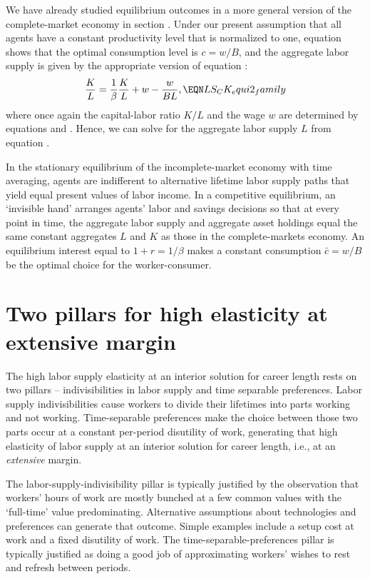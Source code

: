 We have already studied equilibrium outcomes in a more
general version of the complete-market economy in section
. Under our present assumption
that all agents have a constant productivity level
that is normalized to one, equation 
shows that the optimal consumption level is $c=w/B$, and
the aggregate labor supply is given by the appropriate
version of equation :
$$
{K \over L} = {1 \over \beta } {K \over L} + w
     - { w \over B L},
                                                    \EQN LS_CK_equi2_family
$$
where once again the capital-labor ratio $K/L$ and the wage
$w$ are determined by equations  and
. Hence, we can solve for the aggregate labor
supply $L$ from equation .

In the stationary equilibrium of the incomplete-market economy
with time averaging,  agents are indifferent to
alternative lifetime labor supply paths that yield equal  present values of labor income. In a competitive
equilibrium, an `invisible hand'
 arranges  agents' labor and
savings decisions so that at every point in time, the aggregate
labor supply and aggregate asset holdings equal the same
constant aggregates $L$ and $K$ as those in  the complete-markets economy.
An equilibrium interest equal
to $1+r=1/\beta$ makes a constant
consumption $\bar c=w/B$ be the optimal choice for the worker-consumer.


\section{Two pillars for high elasticity at  extensive margin}
The high labor supply elasticity at an interior
solution for career length rests on two pillars -- indivisibilities
in labor supply and time separable preferences. Labor supply
indivisibilities cause workers
to divide their lifetimes into parts  working and not working.
Time-separable preferences make the  choice
between those two parts occur at a constant per-period disutility of
work, generating that  high elasticity of labor supply at an interior
solution for career length, i.e., at an {\it extensive} margin.

The labor-supply-indivisibility pillar is typically justified
by  the observation  that workers' hours of work
are mostly bunched at a few common values   with the `full-time'  value  predominating.
Alternative assumptions about technologies and preferences can generate that
outcome. Simple examples include a setup cost at work and
a fixed disutility of work. The time-separable-preferences pillar
is typically justified as doing a good job of approximating workers' wishes to rest and  refresh
between periods.


